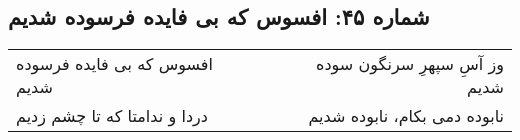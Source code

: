 \begin{center}
\section*{شماره ۴۵: افسوس که بی فایده فرسوده شدیم}
\label{sec:045}
\begin{longtable}{l p{0.5cm} r}
افسوس که بی فایده فرسوده شدیم
&&
وز آسِ سپهرِ سرنگون سوده شدیم
\\
دردا و ندامتا که تا چشم زدیم
&&
نابوده دمی بکام، نابوده شدیم
\\
\end{longtable}
\end{center}
